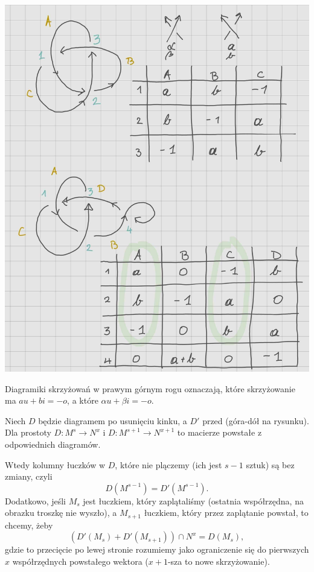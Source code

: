 \begin{center}
  \includegraphics[width=\textwidth]{./rozdzialy/relacja_trefl_1.jpg}
\end{center}
\newpage 

Diagramiki skrzyżowań w prawym górnym rogu oznaczają, które skrzyżowanie ma $au+bi=-o$, a które $\alpha u+\beta i=-o$.

Niech $D$ będzie diagramem po usunięciu kinku, a $D'$ przed (góra-dół na rysunku). Dla prostoty $D:M^s\to N^x$ i $D:M^{s+1}\to N^{x+1}$ to macierze powstałe z odpowiednich diagramów.

Wtedy kolumny łuczków w $D$, które nie plączemy (ich jest $s-1$ sztuk) są bez zmiany, czyli 
$$D(M^{s-1})=D'(M^{s-1}).$$
Dodatkowo, jeśli $M_s$ jest łuczkiem, który zaplątaliśmy (ostatnia współrzędna, na obrazku troszkę nie wyszło), a $M_{s+1}$ łuczkiem, który przez zaplątanie powstał, to chcemy, żeby 
$$(D'(M_s)+ D'(M_{s+1}))\cap N^x=D(M_s),$$
gdzie to przecięcie po lewej stronie rozumiemy jako ograniczenie się do pierwszych $x$ współrzędnych powstałego wektora ($x+1$-sza to nowe skrzyżowanie).

